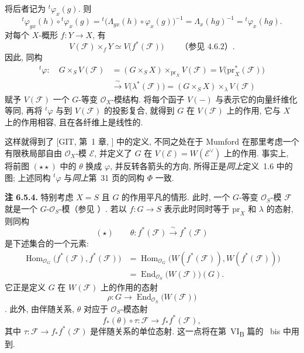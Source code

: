 将后者记为 \({}^{t}\!\varphi_x(g)\). 则
\[
  {}^{t}\!\varphi_{gx}(h)\circ{}^{t}\!\varphi_x(g)
  =
  {}^{t}\!\bigl(\Lambda_{gx}(h)\circ\varphi_x(g)\bigr)^{-1}
  =
  \Lambda_x(hg)^{-1}
  =
  {}^{t}\!\varphi_x(hg).
\]
对每个 \(X\)-概形 \(f:Y\to X\), 有
\[
  V(\mathcal F)\times_fY\simeq V\bigl(f^*(\mathcal F)\bigr)
  \qquad\text{（参见 4.6.2）.}
\]
因此, 同构
\[
\begin{aligned}
  {}^{t}\!\varphi:\quad
  G\times_SV(\mathcal F)
  &=(G\times_SX)\times_{\mathrm{pr}_X}V(\mathcal F)
   =V\bigl(\mathrm{pr}_X^*(\mathcal F)\bigr)\\
  &\xrightarrow{\ \sim\ }
   V\bigl(\lambda^*(\mathcal F)\bigr)
   =(G\times_SX)\times_\lambda V(\mathcal F)
\end{aligned}
\]
赋予 \(V(\mathcal F)\) 一个 \(G\)-等变 \(\mathcal O_X\)-模结构.
将每个函子 \(V(-)\) 与表示它的向量纤维化等同, 再将
\({}^{t}\!\varphi\) 与到 \(V(\mathcal F)\) 的投影复合,
就得到 \(G\) 在 \(V(\mathcal F)\) 上的作用, 它与 \(X\) 上的作用相容,
且在各纤维上是线性的.

这样就得到了 [GIT, 第~1 章, ]
中的定义, 不同之处在于 Mumford 在那里考虑一个有限秩局部自由
\(\mathcal O_X\)-模 \(\mathcal E\), 并定义了 \(G\) 在
\(V(\mathcal E)=W(\mathcal E^\vee)\) 上的作用. 事实上, 将前图
\((\star\star)\) 中的 \(\theta\) 换成 \(\varphi\), 并反转各箭头的方向,
所得正是\emph{同上}定义~1.6 中的图; 上述同构
\({}^{t}\!\varphi\) 与\emph{同上}第~31 页的同构 \(\Phi\) 一致.

\medskip
\noindent{}\textbf{注 6.5.4.}
特别考虑 \(X=S\) 且 \(G\) 的作用平凡的情形.
此时, 一个 \(G\)-等变 \(\mathcal O_S\)-模 \(\mathcal F\)
就是一个 \(G\)-\(\mathcal O_S\)-模（参见 ）.
若以 \(f:G\to S\) 表示此时同时等于 \(\mathrm{pr}_X\) 和
\(\lambda\) 的态射, 则同构
\[
  (\star)\qquad
  \theta:f^*(\mathcal F)\xrightarrow{\ \sim\ }f^*(\mathcal F)
\]
是下述集合的一个元素:
\[
\begin{aligned}
  \operatorname{Hom}_{\mathcal O_G}
    \bigl(f^*(\mathcal F),f^*(\mathcal F)\bigr)
  &=
  \operatorname{Hom}_{\mathcal O_G}
    \bigl(W(f^*(\mathcal F)),W(f^*(\mathcal F))\bigr)\\
  &=
  \operatorname{End}_{\mathcal O_S}\bigl(W(\mathcal F)\bigr)(G).
\end{aligned}
\]
它正是定义 \(G\) 在 \(W(\mathcal F)\) 上的作用的态射
\[
  \rho:G\longrightarrow
  \operatorname{End}_{\mathcal O_S}\bigl(W(\mathcal F)\bigr)
\]
. 此外, 由伴随关系, \(\theta\) 对应于 \(\mathcal O_S\)-模态射
\[
  f_*(\theta)\circ\tau:
  \mathcal F\longrightarrow f_*f^*(\mathcal F),
\]
其中 \(\tau:\mathcal F\to f_*f^*(\mathcal F)\) 是伴随关系的单位态射.
这一点将在第~VI\textsubscript{B} 篇的
~bis 中用到.

